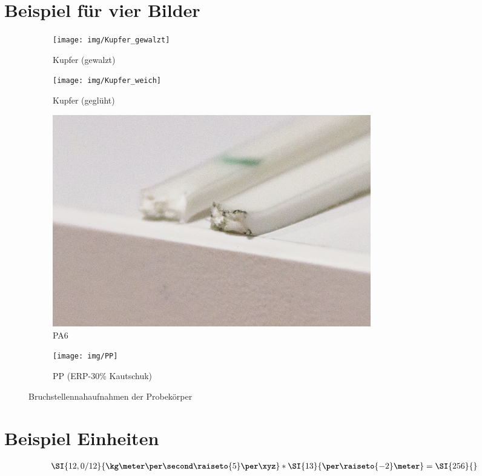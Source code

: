 \newpage


\section{Beispiel für vier Bilder}
\begin{figure}[h!]
	\centering
	\begin{subfigure}{.5\textwidth}
		\centering
		\texttt{[image: img/Kupfer\_gewalzt]}
		\caption{Kupfer (gewalzt)}
		\label{fig:sub3}
	\end{subfigure}%
	\begin{subfigure}{.5\textwidth}
		\centering
		\texttt{[image: img/Kupfer\_weich]}
		\caption{Kupfer (geglüht)}
		\label{fig:sub4}
	\end{subfigure}
	\begin{subfigure}{.5\textwidth}
		\centering
		\includegraphics[width=0.75\textwidth]{img/PA6}
		\caption{PA6}
		\label{fig:sub5}
	\end{subfigure}%
	\begin{subfigure}{.5\textwidth}
		\centering
		\texttt{[image: img/PP]}
		\caption{PP (ERP-30\% Kautschuk)}
		\label{fig:sub6}
	\end{subfigure}
	
	\caption{Bruchstellennahaufnahmen der Probekörper}
	\label{fig:bruchstellen} 
\end{figure}
\FloatBarrier

\section{Beispiel Einheiten}

\begin{align*}
\textbf{$\SI{12,0/12}{\kg\meter\per\second \raiseto{5} \per \xyz}*\SI{13}{\per\raiseto{-2}\meter}=\SI{256}{}$}
\end{align*}

